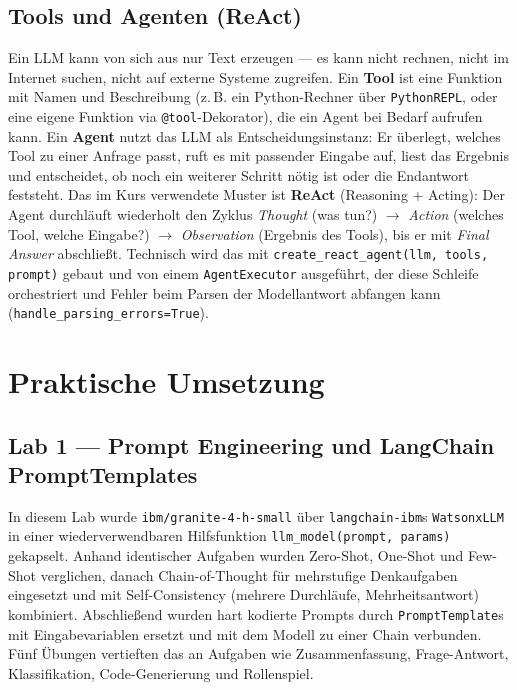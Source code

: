 \subsection{Tools und Agenten (ReAct)}

Ein LLM kann von sich aus nur Text erzeugen --- es kann nicht rechnen, nicht im Internet
suchen, nicht auf externe Systeme zugreifen. Ein \textbf{Tool} ist eine Funktion mit
Namen und Beschreibung (z.\,B. ein Python-Rechner über \texttt{PythonREPL}, oder eine
eigene Funktion via \texttt{@tool}-Dekorator), die ein Agent bei Bedarf aufrufen kann.
Ein \textbf{Agent} nutzt das LLM als Entscheidungsinstanz: Er überlegt, welches Tool zu
einer Anfrage passt, ruft es mit passender Eingabe auf, liest das Ergebnis und
entscheidet, ob noch ein weiterer Schritt nötig ist oder die Endantwort feststeht. Das
im Kurs verwendete Muster ist \textbf{ReAct} (Reasoning + Acting): Der Agent durchläuft
wiederholt den Zyklus \emph{Thought} (was tun?) $\rightarrow$ \emph{Action} (welches
Tool, welche Eingabe?) $\rightarrow$ \emph{Observation} (Ergebnis des Tools), bis er
mit \emph{Final Answer} abschließt. Technisch wird das mit
\texttt{create\_react\_agent(llm, tools, prompt)} gebaut und von einem
\texttt{AgentExecutor} ausgeführt, der diese Schleife orchestriert und Fehler beim
Parsen der Modellantwort abfangen kann (\texttt{handle\_parsing\_errors=True}).

\section{Praktische Umsetzung}

\subsection{Lab 1 --- Prompt Engineering und LangChain PromptTemplates}

In diesem Lab wurde \texttt{ibm/granite-4-h-small} über \texttt{langchain-ibm}s
\texttt{WatsonxLLM} in einer wiederverwendbaren Hilfsfunktion
\texttt{llm\_model(prompt, params)} gekapselt. Anhand identischer Aufgaben wurden
Zero-Shot, One-Shot und Few-Shot verglichen, danach Chain-of-Thought für mehrstufige
Denkaufgaben eingesetzt und mit Self-Consistency (mehrere Durchläufe, Mehrheitsantwort)
kombiniert. Abschließend wurden hart kodierte Prompts durch \texttt{PromptTemplate}s mit
Eingabevariablen ersetzt und mit dem Modell zu einer Chain verbunden. Fünf Übungen
vertieften das an Aufgaben wie Zusammenfassung, Frage-Antwort, Klassifikation,
Code-Generierung und Rollenspiel.

